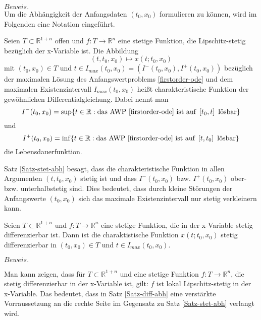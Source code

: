 $Beweis.$ \cite[67,68]{beckGewohnlicheDifferentialgleichungen2018}\\
Um die Abhängigkeit der Anfangsdaten $(t_0,x_0)$ formulieren zu können, wird im Folgenden eine Notation eingeführt.
\begin{definition}
    Seien $T \subset \mathbb{R}^{1+n}$ offen und $f:T \rightarrow \mathbb{R}^{n}$ eine stetige Funktion, die
    Lipschitz-stetig bezüglich der x-Variable ist. Die Abbildung
    \[
        (t, t_0, x_0) \mapsto x(t; t_0, x_0)
    \]
    mit $(t_0, x_0)\in T$ und $t \in I_{max}(t_0,x_0) = \left( I^{-}(t_0,x_0), I^{+}(t_0,x_0) \right)$ bezüglich der
    maximalen Lösung des Anfangswertproblems \eqref{firstorder-ode} und dem maximalen Existenzintervall $I_{max}(t_0,x_0)$ heißt
    charakteristische Funktion der gewöhnlichen Differentialgleichung.
    Dabei nennt man
    \[
        I^{-}(t_0,x_0)=\sup\{ t\in\mathbb{R}: \text{das AWP \eqref{firstorder-ode} ist auf } \left[ t_0, t \right] \text{ lösbar}\}
    \] und
    \[
        I^{+}(t_0,x_0)=\inf\{ t\in\mathbb{R}: \text{das AWP \eqref{firstorder-ode} ist auf } \left[ t, t_0 \right] \text{ lösbar}\}
    \]
    die Lebensdauerfunktion.
\end{definition}
Satz \ref{Satz-stet-abh} besagt, dass die charakteristische Funktion in allen Argumenten $(t, t_0, x_0)$ stetig ist und
dass $I^{-}(t_0,x_0)$ bzw. $I^{+}(t_0,x_0)$ ober- bzw. unterhalbstetig sind. Dies bedeutet, dass durch kleine Störungen der
Anfangswerte $(t_0,x_0)$ sich das maximale Existenzintervall nur stetig verkleinern kann.
\begin{satz}
    \label{Satz-diff-abh}
    Seien $T \subset \mathbb{R}^{1+n}$ und $f:T \rightarrow \mathbb{R}^{n}$ eine stetige Funktion, die in der x-Variable
    stetig differenzierbar ist. Dann ist die charaktistische Funktion $x(t; t_0, x_0)$ stetig differenzierbar in
    $(t_0, x_0) \in T$ und $t \in I_{max}(t_0, x_0)$.
\end{satz}
$Beweis.$ \cite[69,70]{beckGewohnlicheDifferentialgleichungen2018}\\
\begin{bem}
    Man kann zeigen, dass für $T \subset \mathbb{R}^{1+n}$ und eine stetige Funktion $f:T \rightarrow \mathbb{R}^{n}$,
    die stetig differenzierbar in der x-Variable ist, gilt: $f$ ist lokal Lipschitz-stetig in der x-Variable.
    Das bedeutet, dass in Satz \ref{Satz-diff-abh} eine verstärkte Vorraussetzung an die rechte Seite
    im Gegensatz zu Satz \ref{Satz-stet-abh} verlangt wird.
\end{bem}
